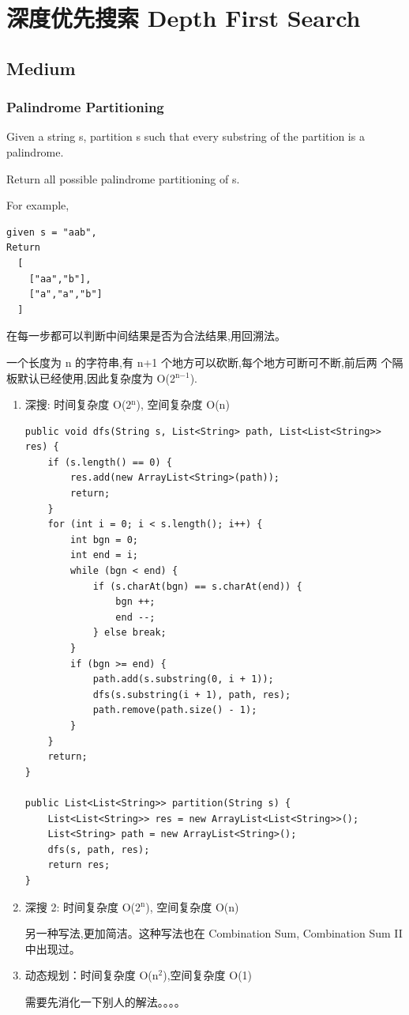 \documentclass[12pt]{book}
\begin{document}
\chapter{深度优先搜索 Depth First Search}
\label{sec-11}
\section{Medium}
\label{sec-11-1}
\subsection{Palindrome Partitioning}
\label{sec-11-1-1}
Given a string s, partition s such that every substring of the partition is a palindrome.

Return all possible palindrome partitioning of s.

For example, 
\lstset{language=java,label= ,caption= ,numbers=none}
\begin{lstlisting}
given s = "aab",
Return
  [
    ["aa","b"],
    ["a","a","b"]
  ]
\end{lstlisting}

在每一步都可以判断中间结果是否为合法结果,用回溯法。

一个长度为 n 的字符串,有 n+1 个地方可以砍断,每个地方可断可不断,前后两
个隔板默认已经使用,因此复杂度为 O(2$^{\text{n−1}}$).

\begin{enumerate}
\item 深搜: 时间复杂度 O(2$^{\text{n}}$), 空间复杂度 O(n)
\label{sec-11-1-1-1}
\lstset{language=java,label= ,caption= ,numbers=none}
\begin{lstlisting}
public void dfs(String s, List<String> path, List<List<String>> res) {
    if (s.length() == 0) {
        res.add(new ArrayList<String>(path));
        return;
    }
    for (int i = 0; i < s.length(); i++) {
        int bgn = 0;
        int end = i;
        while (bgn < end) {
            if (s.charAt(bgn) == s.charAt(end)) {
                bgn ++;
                end --;
            } else break;
        }
        if (bgn >= end) {
            path.add(s.substring(0, i + 1));
            dfs(s.substring(i + 1), path, res);
            path.remove(path.size() - 1);
        } 
    }
    return;
}
        
public List<List<String>> partition(String s) {
    List<List<String>> res = new ArrayList<List<String>>();
    List<String> path = new ArrayList<String>();
    dfs(s, path, res);
    return res;
}
\end{lstlisting}

\item 深搜 2: 时间复杂度 O(2$^{\text{n}}$), 空间复杂度 O(n)
\label{sec-11-1-1-2}

另一种写法,更加简洁。这种写法也在 Combination Sum, Combination Sum II 中出现过。

\item 动态规划：时间复杂度 O(n$^{\text{2}}$),空间复杂度 O(1)
\label{sec-11-1-1-3}

需要先消化一下别人的解法。。。。
\end{enumerate}
\end{document}
